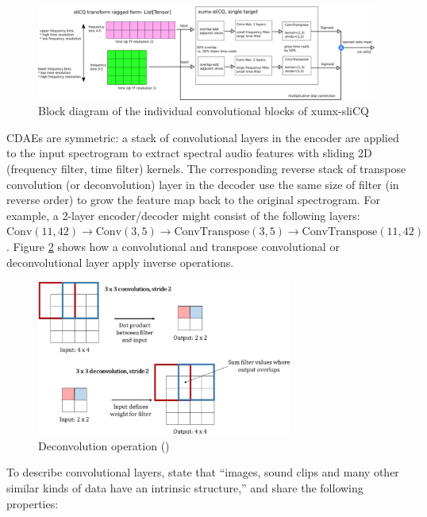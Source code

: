 \documentclass[report.tex]{subfiles}
\begin{document}
\begin{figure}[ht]
	\centering
	\includegraphics[width=\textwidth]{./images-blockdiagrams/xumx_slicq_pertarget.png}
	\caption{Block diagram of the individual convolutional blocks of xumx-sliCQ}
	\label{fig:cdaeslicqt}
\end{figure}

CDAEs are symmetric: a stack of convolutional layers in the encoder are applied to the input spectrogram to extract spectral audio features with sliding 2D (frequency filter, time filter) kernels. The corresponding reverse stack of transpose convolution (or deconvolution) layer in the decoder use the same size of filter (in reverse order) to grow the feature map back to the original spectrogram. For example, a 2-layer encoder/decoder might consist of the following layers: $\text{Conv}(11,42) \rightarrow \text{Conv}(3,5) \rightarrow \text{ConvTranspose}(3,5) \rightarrow \text{ConvTranspose}(11,42)$. Figure \ref{fig:convtranspose} shows how a convolutional and transpose convolutional or deconvolutional layer apply inverse operations.

\begin{figure}[ht]
	\centering
	\includegraphics[width=0.75\textwidth]{./images-neural/convtranspose.png}
	\caption{Deconvolution operation (\cite[11]{convtranspose})}
	\label{fig:convtranspose}
\end{figure}

To describe convolutional layers, \textcite[6]{convguide} state that ``images, sound clips and many other similar kinds of data have an intrinsic structure,'' and share the following properties:
\end{document}
